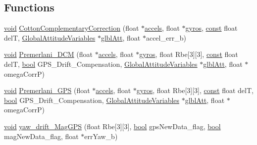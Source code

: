 \subsection*{Functions}
\begin{DoxyCompactItemize}
\item 
\hyperlink{group___n_a_m_e_ga18028b8badbf1ea7e704ccac3c488e82}{void} \hyperlink{group___attitude_ga91405b9ba2764857427c8d2d8d8a3226}{Cotton\-Complementary\-Correction} (float $\ast$\hyperlink{pios__opahrs__proto_8h_a95ac7014e5b72e25193076997442b227}{accels}, float $\ast$\hyperlink{pios__opahrs__proto_8h_ac76cbe9fe0157f71b7a76e57ef3bf7b1}{gyros}, \hyperlink{group___n_a_m_e_ga7ae6d0e43244213b34de2c2b9aa30da6}{const} float del\-T, \hyperlink{struct_global_attitude_variables}{Global\-Attitude\-Variables} $\ast$\hyperlink{group___state_ga76682d72011dc0109f1d5cf25a6c6da0}{glbl\-Att}, float $\ast$accel\-\_\-err\-\_\-b)
\item 
\hyperlink{group___n_a_m_e_ga18028b8badbf1ea7e704ccac3c488e82}{void} \hyperlink{group___attitude_gafac439746843ae2cfb6a4a053a66dc7e}{Premerlani\-\_\-\-D\-C\-M} (float $\ast$\hyperlink{pios__opahrs__proto_8h_a95ac7014e5b72e25193076997442b227}{accels}, float $\ast$\hyperlink{pios__opahrs__proto_8h_ac76cbe9fe0157f71b7a76e57ef3bf7b1}{gyros}, float Rbe\mbox{[}3\mbox{]}\mbox{[}3\mbox{]}, \hyperlink{group___n_a_m_e_ga7ae6d0e43244213b34de2c2b9aa30da6}{const} float del\-T, \hyperlink{group___exported__types_gaf6a258d8f3ee5206d682d799316314b1}{bool} G\-P\-S\-\_\-\-Drift\-\_\-\-Compensation, \hyperlink{struct_global_attitude_variables}{Global\-Attitude\-Variables} $\ast$\hyperlink{group___state_ga76682d72011dc0109f1d5cf25a6c6da0}{glbl\-Att}, float $\ast$omega\-Corr\-P)
\item 
\hyperlink{group___n_a_m_e_ga18028b8badbf1ea7e704ccac3c488e82}{void} \hyperlink{group___attitude_ga688e0cf65377d9e7f81f303a1d5b96c7}{Premerlani\-\_\-\-G\-P\-S} (float $\ast$\hyperlink{pios__opahrs__proto_8h_a95ac7014e5b72e25193076997442b227}{accels}, float $\ast$\hyperlink{pios__opahrs__proto_8h_ac76cbe9fe0157f71b7a76e57ef3bf7b1}{gyros}, float Rbe\mbox{[}3\mbox{]}\mbox{[}3\mbox{]}, \hyperlink{group___n_a_m_e_ga7ae6d0e43244213b34de2c2b9aa30da6}{const} float del\-T, \hyperlink{group___exported__types_gaf6a258d8f3ee5206d682d799316314b1}{bool} G\-P\-S\-\_\-\-Drift\-\_\-\-Compensation, \hyperlink{struct_global_attitude_variables}{Global\-Attitude\-Variables} $\ast$\hyperlink{group___state_ga76682d72011dc0109f1d5cf25a6c6da0}{glbl\-Att}, float $\ast$omega\-Corr\-P)
\item 
\hyperlink{group___n_a_m_e_ga18028b8badbf1ea7e704ccac3c488e82}{void} \hyperlink{group___attitude_ga81766afbca58a5d4fc811c0727f3bdf2}{yaw\-\_\-drift\-\_\-\-Mag\-G\-P\-S} (float Rbe\mbox{[}3\mbox{]}\mbox{[}3\mbox{]}, \hyperlink{group___exported__types_gaf6a258d8f3ee5206d682d799316314b1}{bool} gps\-New\-Data\-\_\-flag, \hyperlink{group___exported__types_gaf6a258d8f3ee5206d682d799316314b1}{bool} mag\-New\-Data\-\_\-flag, float $\ast$err\-Yaw\-\_\-b)

\end{DoxyCompactItemize}
